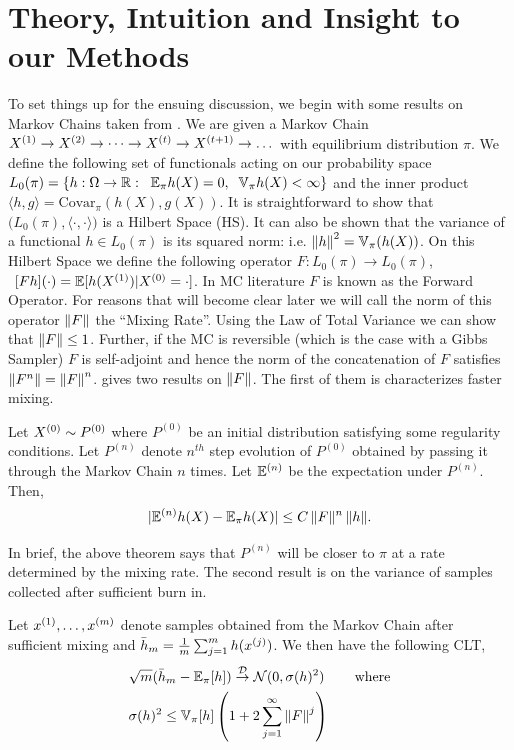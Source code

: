 \documentclass{article} %
\begin{document}
\section{Theory, Intuition and Insight to our Methods}
To set things up for the ensuing discussion, we begin with some results on
Markov Chains taken from \cite{liu01mcmcscicomp,liu94covargibbs}. We are given a
Markov Chain $ X^{(1)} \rightarrow X^{(2)} \rightarrow \dots \rightarrow X^{(t)}
\rightarrow X^{(t+1)} \rightarrow \dots $ with equilibrium distribution $\pi$.
We define the following set of functionals acting on our probability space
$L_0(\pi) = \{ h:\Omega \rightarrow \mathbb{R} :\;\; \mathbb{E}_{\pi} h(X) =
0, \;\; \mathbb{V}_{\pi}h(X) < \infty \}$ and the inner product $\langle h, g \rangle =
\text{Covar}_\pi(h(X), g(X))$. It is straightforward to show that
$\big(L_0(\pi), \langle \cdot, \cdot \rangle \big)$ is a Hilbert Space (HS).
It can also be shown that the variance of a functional $h \in L_0(\pi)$ is its
squared norm: i.e. $\left\|h\right\|^2 = \mathbb{V}_\pi(h(X))$.
On this Hilbert Space we define the following operator $F:L_0(\pi) \rightarrow
L_0(\pi)$, $ \,\; [Fh](\cdot) = \mathbb{E}[h(X^{(1)}) | X^{(0)} = \cdot]$. In MC
literature $F$ is known as the Forward Operator. For reasons that will become
clear later we will call the norm of this operator $\left\|F\right\|$ the ``Mixing
Rate''. Using the Law of Total Variance we can show that $\left\|F\right\| \leq 1$.
Further, if the MC
is reversible (which is the case with a Gibbs Sampler) $F$ is self-adjoint and
hence the norm of the concatenation of $F$ satisfies $\left\|F^n\right\| = \left\|F\right\|^n$.
\cite{liu01mcmcscicomp} gives two results on $\left\|F\right\|$. The first of them is
characterizes faster mixing.

\begin{theorem}
Let $X^{(0)} \sim P^{(0)}$ where $P^{(0)}$ be an initial distribution satisfying
some regularity conditions. Let  $P^{(n)}$ denote $n^{th}$ step evolution of
$P^{(0)}$ obtained by passing it through the Markov Chain $n$ times. Let
$\mathbb{E}^{(n)}$ be the expectation under $P^{(n)}$. Then,
\[
| \mathbb{E}^{(n)} h(X) - \mathbb{E}_\pi h(X) | \leq C \, \|F\|^n \, \|h\|.
\]
\end{theorem}

In brief, the above theorem says that $P^{(n)}$ will be closer to $\pi$ at a
rate determined by the mixing rate. The second result is on the variance of
samples collected after sufficient burn in.

\begin{theorem}
Let $x^{(1)}, \dots, x^{(m)}$ denote samples obtained from the Markov Chain
after sufficient mixing and $\bar{h}_m = \frac{1}{m} \sum_{j=1}^m h(x^{(j)})$.
We then have the following CLT,
\begin{align*}
& \sqrt{m}(\bar{h}_m - \mathbb{E}_\pi[h]) \overset{\mathcal{D}}{\to} \mathcal{N}(0, \sigma(h)^2)
\hspace{0.3in} \text{where} \\
& \sigma(h)^2 \leq \mathbb{V}_\pi[h] \left( 1 + 2 \sum_{j=1}^\infty \left\|F\right\|^j \right)
\end{align*}
\end{theorem}
\end{document}
